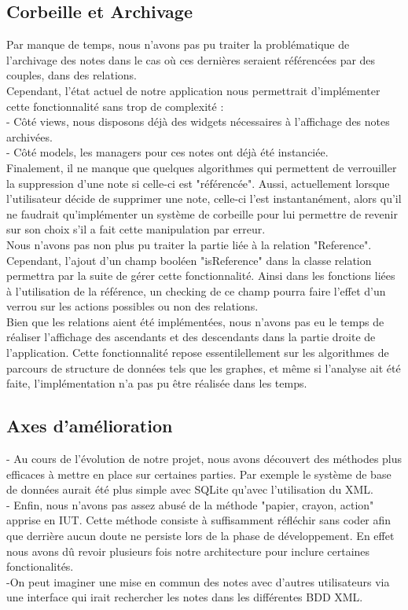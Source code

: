 \documentclass[a4paper]{report}
\begin{document}
\subsection{Corbeille et Archivage}
Par manque de temps, nous n'avons pas pu traiter la problématique de l'archivage des notes dans le cas où ces dernières seraient référencées par des couples, dans des relations.\\
Cependant, l'état actuel de notre application nous permettrait d'implémenter cette fonctionnalité sans trop de complexité : \\
- Côté views, nous disposons déjà des widgets nécessaires à l'affichage des notes archivées. \\
- Côté models, les managers pour ces notes ont déjà été instanciée.\\
Finalement, il ne manque que quelques algorithmes qui permettent de verrouiller la suppression d'une note si celle-ci est "référencée". Aussi, actuellement lorsque l'utilisateur décide de supprimer une note, celle-ci l'est instantanément, alors qu'il ne faudrait qu'implémenter un système de corbeille pour lui permettre de revenir sur son choix s'il a fait cette manipulation par erreur.\\
Nous n'avons pas non plus pu traiter la partie liée à la relation "Reference".\\ Cependant, l'ajout d'un champ booléen "isReference" dans la classe relation permettra par la suite de gérer cette fonctionnalité. Ainsi dans les fonctions liées à l'utilisation de la référence, un checking de ce champ pourra faire l'effet d'un verrou sur les actions possibles ou non des relations.\\
Bien que les relations aient été implémentées, nous n'avons pas eu le temps de réaliser l'affichage des ascendants et des descendants dans la partie droite de l'application. Cette fonctionnalité repose essentilellement sur les algorithmes de parcours de structure de données tels que les graphes, et même si l'analyse ait été faite, l'implémentation n'a pas pu être réalisée dans les temps.

\subsection{Axes d'amélioration}
- Au cours de l'évolution de notre projet, nous avons découvert des méthodes plus efficaces à mettre en place sur certaines parties. Par exemple le système de base de données aurait été plus simple avec SQLite qu'avec l'utilisation du XML. \\
- Enfin, nous n'avons pas assez abusé de la méthode "papier, crayon, action" apprise en IUT. Cette méthode consiste à suffisamment réfléchir sans coder afin que derrière aucun doute ne persiste lors de la phase de développement. En effet nous avons dû revoir plusieurs fois notre architecture pour inclure certaines fonctionalités.\\
-On peut imaginer une mise en commun des notes avec d'autres utilisateurs via une interface qui irait rechercher les notes dans les différentes BDD XML.
\end{document}
